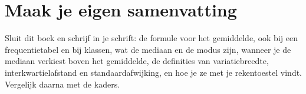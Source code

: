 \opdrachtenkop

\begin{oefeningen}






















\end{oefeningen}


\begin{oefeningen}






\end{oefeningen}


\ifzelfstudie
\section*{Maak je eigen samenvatting}
Sluit dit boek en schrijf in je schrift: de formule voor het gemiddelde, ook bij een frequentietabel en bij klassen, wat de mediaan en de modus zijn, wanneer je de mediaan verkiest boven het gemiddelde, de definities van variatiebreedte, interkwartielafstand en standaardafwijking, en hoe je ze met je rekentoestel vindt. Vergelijk daarna met de kaders.
\fi
